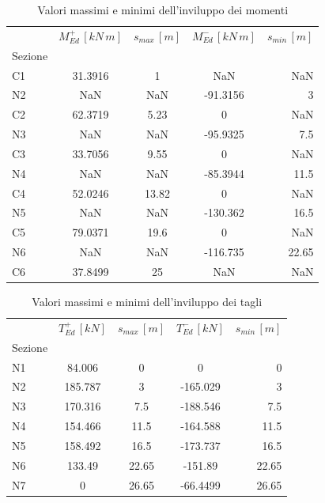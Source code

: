 \begin{table}
  	\centering
  	\caption{Valori massimi e minimi dell'inviluppo dei momenti}
  	\label{tab:max_min_bendingMomentEnvelope_sleFreq}
  	\begin{tabular}{lcccr}
		\toprule
		& $M_{Ed}^+\,[kN\,m]$ & $s_{max}\,[m]$ & $M_{Ed}^-\,[kN\,m]$ & $s_{min}\,[m]$ \\
		Sezione &             &          &             &          \\
\midrule
C1      &     31.3916 &        1 &         NaN &      NaN \\
N2      &         NaN &      NaN &    -91.3156 &        3 \\
C2      &     62.3719 &     5.23 &           0 &      NaN \\
N3      &         NaN &      NaN &    -95.9325 &      7.5 \\
C3      &     33.7056 &     9.55 &           0 &      NaN \\
N4      &         NaN &      NaN &    -85.3944 &     11.5 \\
C4      &     52.0246 &    13.82 &           0 &      NaN \\
N5      &         NaN &      NaN &    -130.362 &     16.5 \\
C5      &     79.0371 &     19.6 &           0 &      NaN \\
N6      &         NaN &      NaN &    -116.735 &    22.65 \\
C6      &     37.8499 &       25 &         NaN &      NaN \\
\bottomrule
	\end{tabular}
  \end{table}
  
\begin{table}
  	\centering
  	\caption{Valori massimi e minimi dell'inviluppo dei tagli}
  	\label{tab:shearEnvelope_sleFreq}
  	\begin{tabular}{lcccr}
		\toprule
		& $T_{Ed}^+\,[kN]$ & $s_{max}\,[m]$ & $T_{Ed}^-\,[kN]$ & $s_{min}\,[m]$ \\
		Sezione &             &          &             &          \\
		\midrule
N1      &    84.006 &        0 &         0 &        0 \\
N2      &   185.787 &        3 &  -165.029 &        3 \\
N3      &   170.316 &      7.5 &  -188.546 &      7.5 \\
N4      &   154.466 &     11.5 &  -164.588 &     11.5 \\
N5      &   158.492 &     16.5 &  -173.737 &     16.5 \\
N6      &    133.49 &    22.65 &   -151.89 &    22.65 \\
N7      &         0 &    26.65 &  -66.4499 &    26.65 \\
		\bottomrule
	\end{tabular}
  \end{table}

\cleardoublepage
